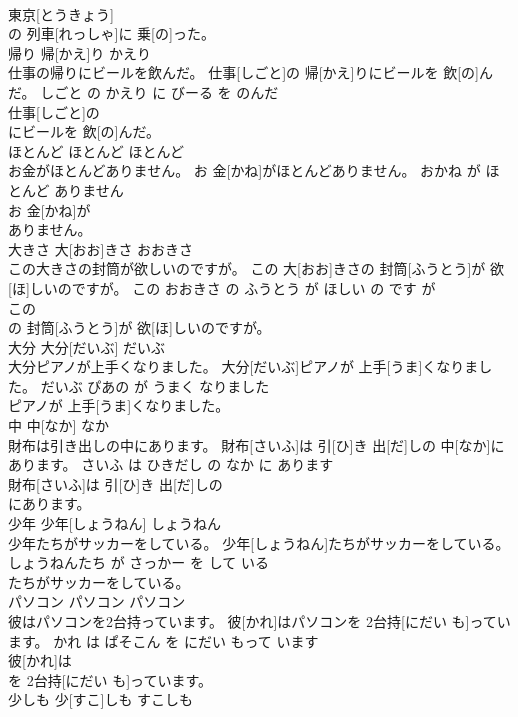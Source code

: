 \documentclass[8pt]{extreport}
\begin{document}
\begin{CJK}{UTF8}{min}
\\	東京[とうきょう]
\\	の 列車[れっしゃ]に 乗[の]った。		
\\	帰り	帰[かえ]り	かえり	
\\	仕事の帰りにビールを飲んだ。	仕事[しごと]の 帰[かえ]りにビールを 飲[の]んだ。	しごと の かえり に びーる を のんだ	
\\	仕事[しごと]の
\\	にビールを 飲[の]んだ。		
\\	ほとんど	ほとんど	ほとんど	
\\	お金がほとんどありません。	お 金[かね]がほとんどありません。	おかね が ほとんど ありません	
\\	お 金[かね]が
\\	ありません。		
\\	大きさ	大[おお]きさ	おおきさ	
\\	この大きさの封筒が欲しいのですが。	この 大[おお]きさの 封筒[ふうとう]が 欲[ほ]しいのですが。	この おおきさ の ふうとう が ほしい の です が	
\\	この
\\	の 封筒[ふうとう]が 欲[ほ]しいのですが。		
\\	大分	大分[だいぶ]	だいぶ	
\\	大分ピアノが上手くなりました。	大分[だいぶ]ピアノが 上手[うま]くなりました。	だいぶ ぴあの が うまく なりました	
\\	ピアノが 上手[うま]くなりました。		
\\	中	中[なか]	なか	
\\	財布は引き出しの中にあります。	財布[さいふ]は 引[ひ]き 出[だ]しの 中[なか]にあります。	さいふ は ひきだし の なか に あります	
\\	財布[さいふ]は 引[ひ]き 出[だ]しの
\\	にあります。		
\\	少年	少年[しょうねん]	しょうねん	
\\	少年たちがサッカーをしている。	少年[しょうねん]たちがサッカーをしている。	しょうねんたち が さっかー を して いる	
\\	たちがサッカーをしている。		
\\	パソコン	パソコン	パソコン	
\\	彼はパソコンを2台持っています。	彼[かれ]はパソコンを 2台持[にだい も]っています。	かれ は ぱそこん を にだい もって います	
\\	彼[かれ]は
\\	を 2台持[にだい も]っています。		
\\	少しも	少[すこ]しも	すこしも	

\end{CJK}
\end{document}
